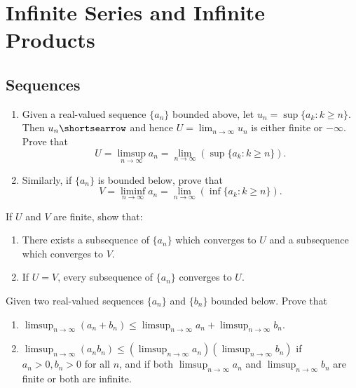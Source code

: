 \chapter{Infinite Series and Infinite Products}
\section{Sequences}
\begin{problembox}
\begin{enumerate}[label=(\alph*)]
\item Given a real-valued sequence \(\{a_n\}\) bounded above, let \(u_n = \sup \{a_k : k \geq n\}\). Then \(u_n \shortsearrow\) and hence \(U = \lim_{n \to \infty} u_n\) is either finite or \(-\infty\). Prove that
\[U = \limsup_{n \to \infty} a_n = \lim_{n \to \infty} (\sup \{a_k : k \geq n\}).\]

\item Similarly, if \(\{a_n\}\) is bounded below, prove that
\[V = \liminf_{n \to \infty} a_n = \lim_{n \to \infty} (\inf \{a_k : k \geq n\}).\]
\end{enumerate}

If \( U \) and \( V \) are finite, show that:
\begin{enumerate}[label=(\alph*),resume]
\item There exists a subsequence of \(\{a_n\}\) which converges to \( U \) and a subsequence which converges to \( V \).
\item If \( U = V \), every subsequence of \(\{a_n\}\) converges to \( U \).
\end{enumerate}
\end{problembox}
    
    \begin{problembox}
    Given two real-valued sequences \(\{a_n\}\) and \(\{b_n\}\) bounded below. Prove that
    \begin{enumerate}[label=(\alph*)]
    \item \(\limsup_{n \to \infty} (a_n + b_n) \leq \limsup_{n \to \infty} a_n + \limsup_{n \to \infty} b_n\).
    \item \(\limsup_{n \to \infty} (a_n b_n) \leq (\limsup_{n \to \infty} a_n)(\limsup_{n \to \infty} b_n)\) if \(a_n > 0, b_n > 0\) for all \(n\), and if both \(\limsup_{n \to \infty} a_n\) and \(\limsup_{n \to \infty} b_n\) are finite or both are infinite.
    \end{enumerate}
    \end{problembox}
    
